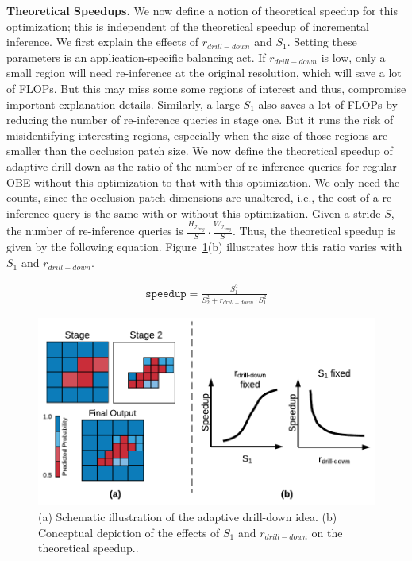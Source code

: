 \vspace{2mm}
\noindent \textbf{Theoretical Speedups.}
We now define a notion of theoretical speedup for this optimization; this is independent of the theoretical speedup of incremental inference. We first explain the effects of $r_{drill-down}$ and $S_1$. Setting these parameters is an application-specific balancing act. If $r_{drill-down}$ is low, only a small region will need re-inference at the original resolution, which will save a lot of FLOPs. But this may miss some some regions of interest and thus, compromise important explanation details. Similarly, a large $S_1$ also saves a lot of FLOPs by reducing the number of re-inference queries in stage one. But it runs the risk of misidentifying interesting regions, especially when the size of those regions are smaller than the occlusion patch size. We now define the theoretical speedup of adaptive drill-down as the ratio of the number of re-inference queries for regular OBE without this optimization to that with this optimization. We only need the counts, since the occlusion patch dimensions are unaltered, i.e., the cost of a re-inference query is the same with or without this optimization. Given a stride $S$, the number of re-inference queries is $\frac{H_{\mathcal{I}_{img}}}{S} \cdot \frac{W_{\mathcal{I}_{img}}}{S}$. Thus, the theoretical speedup is given by the following equation. Figure~\ref{fig:adaptive_drill_down}(b) illustrates how this ratio varies with $S_1$ and $r_{drill-down}$.

\vspace{-2mm}
\begin{align}
\label{eqn:adaptive-drill-down-eqn}
\texttt{speedup} = \frac{S^2_1}{S^2_2+r_{drill-down} \cdot S^2_1}
\end{align}

\begin{figure}[t]
\includegraphics[width=\columnwidth]{images/adaptive_drill_down}
\vspace{-8mm}
\caption{(a) Schematic illustration of the adaptive drill-down idea. (b) Conceptual depiction of the effects of $S_1$ and $r_{drill-down}$ on the theoretical speedup.. }
\label{fig:adaptive_drill_down}
\end{figure}

